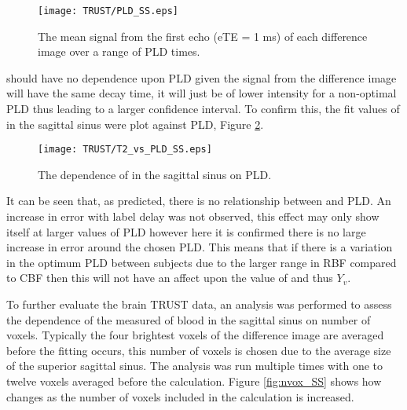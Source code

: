 \begin{figure}[H]
	\centering
	\texttt{[image: TRUST/PLD\_SS.eps]}
	\caption{The mean signal from the first echo (\ac{eTE} = 1 ms) of each difference image over a range of \ac{PLD} times.}
	\label{fig:Sig_vs_PLD_SS}	
\end{figure}

\ttwo should have no dependence upon \ac{PLD} given the signal from the difference image will have the same decay time, it will just be of lower intensity for a non-optimal \ac{PLD} thus leading to a larger confidence interval. To confirm this, the fit values of \ttwo in the sagittal sinus were plot against \ac{PLD}, Figure \ref{fig:SS_T2vsPLD}.

\begin{figure}[H]
	\centering
	\texttt{[image: TRUST/T2\_vs\_PLD\_SS.eps]}
	\caption{The dependence of \ttwo in the sagittal sinus on \ac{PLD}.}
	\label{fig:SS_T2vsPLD}	
\end{figure}


It can be seen that, as predicted, there is no relationship between \ttwo and \ac{PLD}. An increase in error with label delay was not observed, this effect may only show itself at larger values of \ac{PLD} however here it is confirmed there is no large increase in error around the chosen \ac{PLD}. This means that if there is a variation in the optimum \ac{PLD} between subjects due to the larger range in \ac{RBF} compared to \ac{CBF} then this will not have an affect upon the value of \ttwo and thus $Y_v$.

To further evaluate the brain \ac{TRUST} data, an analysis was performed to assess the dependence of the measured \ttwo of blood in the sagittal sinus on number of voxels. Typically the four brightest voxels of the difference image are averaged before the fitting occurs, this number of voxels is chosen due to the average size of the superior sagittal sinus. The analysis was run multiple times with one to twelve voxels averaged before the calculation. Figure \ref{fig:nvox_SS} shows how \ttwo changes as the number of voxels included in the calculation is increased. %

